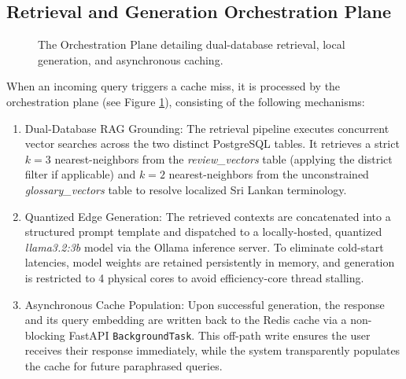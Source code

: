 \documentclass{ieeeaccess}
\begin{document}
\subsection{Retrieval and Generation Orchestration Plane}
\begin{figure}[htbp]
\centering
{}
\caption{The Orchestration Plane detailing dual-database retrieval, local generation, and asynchronous caching.}
\label{fig:orchestration_plane}
\end{figure}

When an incoming query triggers a cache miss, it is processed by the orchestration plane (see Figure \ref{fig:orchestration_plane}), consisting of the following mechanisms:
\begin{enumerate}
    \item{Dual-Database RAG Grounding}: The retrieval pipeline executes concurrent vector searches across the two distinct PostgreSQL tables. It retrieves a strict $k=3$ nearest-neighbors from the \emph{review\_vectors} table (applying the district filter if applicable) and $k=2$ nearest-neighbors from the unconstrained \emph{glossary\_vectors} table to resolve localized Sri Lankan terminology.
    \item {Quantized Edge Generation}: The retrieved contexts are concatenated into a structured prompt template and dispatched to a locally-hosted, quantized \emph{llama3.2:3b} model via the Ollama inference server. To eliminate cold-start latencies, model weights are retained persistently in memory, and generation is restricted to 4 physical cores to avoid efficiency-core thread stalling.
    \item {Asynchronous Cache Population}: Upon successful generation, the response and its query embedding are written back to the Redis cache via a non-blocking FastAPI \texttt{BackgroundTask}. This off-path write ensures the user receives their response immediately, while the system transparently populates the cache for future paraphrased queries.
\end{enumerate}
\end{document}
